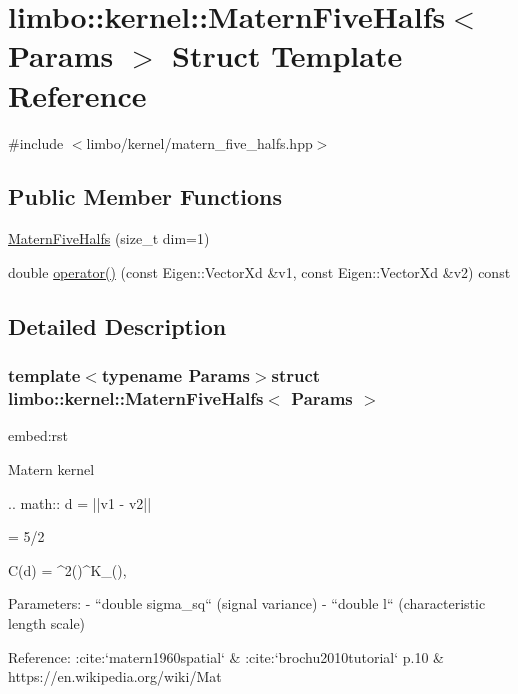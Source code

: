 \hypertarget{structlimbo_1_1kernel_1_1_matern_five_halfs}{}\section{limbo\+:\+:kernel\+:\+:Matern\+Five\+Halfs$<$ Params $>$ Struct Template Reference}
\label{structlimbo_1_1kernel_1_1_matern_five_halfs}


{\ttfamily \#include $<$limbo/kernel/matern\+\_\+five\+\_\+halfs.\+hpp$>$}

\subsection*{Public Member Functions}
\begin{DoxyCompactItemize}
\item 
\hyperlink{structlimbo_1_1kernel_1_1_matern_five_halfs_a6b7d9003e76fb0284e209b3b5d9527ee}{Matern\+Five\+Halfs} (size\+\_\+t dim=1)
\item 
double \hyperlink{structlimbo_1_1kernel_1_1_matern_five_halfs_a070ed97b62698e9c9d10f606254954e7}{operator()} (const Eigen\+::\+Vector\+Xd \&v1, const Eigen\+::\+Vector\+Xd \&v2) const 
\end{DoxyCompactItemize}


\subsection{Detailed Description}
\subsubsection*{template$<$typename Params$>$struct limbo\+::kernel\+::\+Matern\+Five\+Halfs$<$ Params $>$}

\begin{DoxyVerb}embed:rst

Matern kernel

.. math::
  d = ||v1 - v2||

  \nu = 5/2

  C(d) = \sigma^2\Bigg(\sqrt{2\nu}\Bigg)^\nu K_\nu\Bigg(\sqrt{2\nu}\Bigg),


Parameters:
  - ``double sigma_sq`` (signal variance)
  - ``double l`` (characteristic length scale)

Reference: :cite:`matern1960spatial` & :cite:`brochu2010tutorial` p.10 & https://en.wikipedia.org/wiki/Mat%
\end{DoxyVerb}
 

